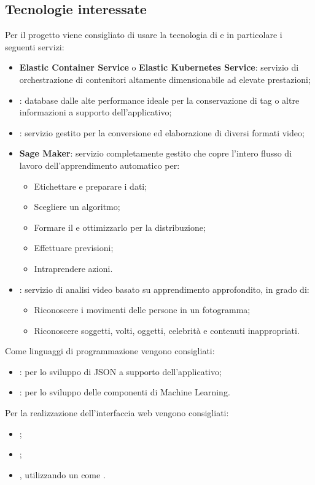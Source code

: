 \documentclass[../studio-di-fattibilita.tex]{subfiles}
\begin{document}
\subsection{Tecnologie interessate}%
\label{sub:tecnologie_interessate}
Per il progetto viene consigliato di usare la tecnologia di  e in particolare i seguenti servizi:
\begin{itemize}
  \item \textbf{Elastic  Container  Service}  o  \textbf{Elastic  Kubernetes  Service}: servizio  di  orchestrazione  di  contenitori  altamente  dimensionabile  ad  elevate prestazioni;
  \item {}: database  dalle alte performance ideale per la conservazione di tag o altre informazioni a supporto dell'applicativo;
  \item {}: servizio gestito per la conversione ed elaborazione di diversi formati video;
  \item \textbf{Sage Maker}: servizio completamente gestito che copre l'intero flusso di lavoro dell'apprendimento automatico per:
  \begin{itemize}
    \item Etichettare e preparare i dati;
    \item Scegliere un algoritmo;
    \item Formare il  e ottimizzarlo per la distribuzione;
    \item Effettuare previsioni;
    \item Intraprendere azioni.
  \end{itemize}
  \item {}: servizio di analisi video basato su apprendimento approfondito, in grado di:
  \begin{itemize}
    \item Riconoscere i movimenti delle persone in un fotogramma;
    \item Riconoscere soggetti, volti, oggetti, celebrità e contenuti inappropriati.
  \end{itemize}
\end{itemize}
Come linguaggi di programmazione vengono consigliati:
\begin{itemize}
    \item {}: per lo sviluppo di  JSON a supporto dell’applicativo;
    \item {}: per lo sviluppo delle componenti di Machine Learning.
\end{itemize}
Per la realizzazione dell'interfaccia web vengono consigliati:
\begin{itemize}
  \item {};
  \item {};
  \item {}, utilizzando un   come .
\end{itemize}
\end{document}
